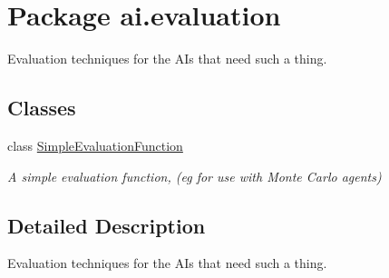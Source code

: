 \hypertarget{namespaceai_1_1evaluation}{
\section{Package ai.evaluation}
\label{namespaceai_1_1evaluation}
}


Evaluation techniques for the AIs that need such a thing.  


\subsection*{Classes}
\begin{DoxyCompactItemize}
\item 
class \hyperlink{classai_1_1evaluation_1_1_simple_evaluation_function}{SimpleEvaluationFunction}
\begin{DoxyCompactList}\small\item\em A simple evaluation function, (eg for use with Monte Carlo agents) \end{DoxyCompactList}\end{DoxyCompactItemize}


\subsection{Detailed Description}
Evaluation techniques for the AIs that need such a thing. 